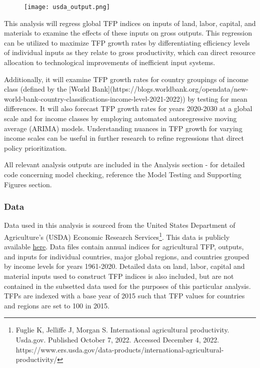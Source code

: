 \documentclass[
  letterpaper,
  DIV=11,
  numbers=noendperiod]{scrartcl}
\begin{document}
\begin{figure}

{\centering \texttt{[image: usda\_output.png]}

}

\end{figure}

This analysis will regress global TFP indices on inputs of land, labor,
capital, and materials to examine the effects of these inputs on gross
outputs. This regression can be utilized to maximize TFP growth rates by
differentiating efficiency levels of individual inputs as they relate to
gross productivity, which can direct resource allocation to
technological improvements of inefficient input systems.

Additionally, it will examine TFP growth rates for country groupings of
income class (defined by the {[}World
Bank{]}(https://blogs.worldbank.org/opendata/new-world-bank-country-classifications-income-level-2021-2022))
by testing for mean differences. It will also forecast TFP growth rates
for years 2020-2030 at a global scale and for income classes by
employing automated autoregressive moving average (ARIMA) models.
Understanding nuances in TFP growth for varying income scales can be
useful in further research to refine regressions that direct policy
prioritization.

All relevant analysis outputs are included in the Analysis section - for
detailed code concerning model checking, reference the Model Testing and
Supporting Figures section.

\hypertarget{data}{%
\subsubsection{Data}\label{data}}

Data used in this analysis is sourced from the United States Department
of Agriculture's (USDA) Economic Research Services\footnote{Fuglie K,
  Jelliffe J, Morgan S. International agricultural productivity.
  Usda.gov. Published October 7, 2022. Accessed December 4, 2022.
  https://www.ers.usda.gov/data-products/international-agricultural-productivity/}.
This data is publicly available
\href{https://www.ers.usda.gov/data-products/international-agricultural-productivity/}{here}.
Data files contain annual indices for agricultural TFP, outputs, and
inputs for individual countries, major global regions, and countries
grouped by income levels for years 1961-2020. Detailed data on land,
labor, capital and material inputs used to construct TFP indices is also
included, but are not contained in the subsetted data used for the
purposes of this particular analysis. TFPs are indexed with a base year
of 2015 such that TFP values for countries and regions are set to 100 in
2015.
\end{document}
